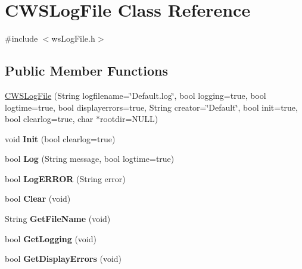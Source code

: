 \hypertarget{class_c_w_s_log_file}{
\section{CWSLogFile Class Reference}
\label{class_c_w_s_log_file}
}


{\ttfamily \#include $<$wsLogFile.h$>$}\subsection*{Public Member Functions}
\begin{DoxyCompactItemize}
\item 
\hyperlink{class_c_w_s_log_file_a2afe19c9c17e8c4b1b471b38c706c5c5}{CWSLogFile} (String logfilename=\char`\"{}Default.log\char`\"{}, bool logging=true, bool logtime=true, bool displayerrors=true, String creator=\char`\"{}Default\char`\"{}, bool init=true, bool clearlog=true, char $\ast$rootdir=NULL)
\item 
\hypertarget{class_c_w_s_log_file_a6c51418255bdb3295caa6eeafdaef593}{
void {\bfseries Init} (bool clearlog=true)}
\label{class_c_w_s_log_file_a6c51418255bdb3295caa6eeafdaef593}

\item 
\hypertarget{class_c_w_s_log_file_abee232e16c0ddea8de84e4ba3f05c1d9}{
bool {\bfseries Log} (String message, bool logtime=true)}
\label{class_c_w_s_log_file_abee232e16c0ddea8de84e4ba3f05c1d9}

\item 
\hypertarget{class_c_w_s_log_file_aa26006b97ba5c1e1aeffcba42aaf54a3}{
bool {\bfseries LogERROR} (String error)}
\label{class_c_w_s_log_file_aa26006b97ba5c1e1aeffcba42aaf54a3}

\item 
\hypertarget{class_c_w_s_log_file_ab26dd30d3423201dbb0371a38be4e6fd}{
bool {\bfseries Clear} (void)}
\label{class_c_w_s_log_file_ab26dd30d3423201dbb0371a38be4e6fd}

\item 
\hypertarget{class_c_w_s_log_file_ab5182c5d848e51caca0122f04c091239}{
String {\bfseries GetFileName} (void)}
\label{class_c_w_s_log_file_ab5182c5d848e51caca0122f04c091239}

\item 
\hypertarget{class_c_w_s_log_file_a5a3d66defdbcabf256c54527f5e8af2e}{
bool {\bfseries GetLogging} (void)}
\label{class_c_w_s_log_file_a5a3d66defdbcabf256c54527f5e8af2e}

\item 
\hypertarget{class_c_w_s_log_file_ae3158b163e91f70b4935dc5756b50875}{
bool {\bfseries GetDisplayErrors} (void)}
\label{class_c_w_s_log_file_ae3158b163e91f70b4935dc5756b50875}

\end{DoxyCompactItemize}


